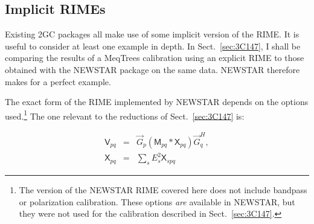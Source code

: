 \documentclass[]{aa}
\newcommand{\herm}{H}
\newcommand{\jones}[2]{\vec {#1}_{#2}}
\newcommand{\jonesT}[2]{\vec {#1}^{\herm}_{#2}}
\newcommand{\coh}[2]{\mathsf{{#1}}_{{#2}}}
\begin{document}
\subsection{\label{sec:implicit-me-newstar}Implicit RIMEs}

Existing 2GC packages all make use of some implicit version of the RIME. It is useful to consider at least one example in depth. In Sect.~\ref{sec:3C147}, I shall be comparing the results of a MeqTrees calibration using an explicit RIME to those obtained with the NEWSTAR package on the same data. NEWSTAR therefore makes for a perfect example.

The exact form of the RIME implemented by NEWSTAR depends on the options used.\footnote{The version of the NEWSTAR RIME covered here does not include bandpass or polarization calibration. These options \emph{are} available in NEWSTAR, but they were not used for the calibration described in Sect.~\ref{sec:3C147}.} The one relevant to the reductions of Sect.~\ref{sec:3C147} is:

\begin{eqnarray}\label{eq:newstar-rime}
\coh{V}{pq} & = & \jones{G}{p} \left ( \coh{M}{pq} \ast \coh{X}{pq} \right ) \jonesT{G}{q}, \\
\nonumber \coh{X}{pq} & = & \sum_{s} E^2_s \coh{X}{spq} 
\end{eqnarray}
\end{document}
